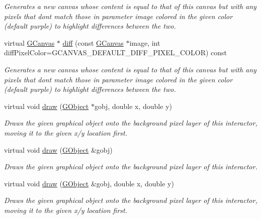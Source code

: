 \begin{DoxyCompactItemize}
\begin{DoxyCompactList}\small\item\em Generates a new canvas whose content is equal to that of this canvas but with any pixels that don\textquotesingle{}t match those in parameter \textquotesingle{}image\textquotesingle{} colored in the given color (default purple) to highlight differences between the two. \end{DoxyCompactList}\item 
virtual \mbox{\hyperlink{classsgl_1_1GCanvas}{G\+Canvas}} $\ast$ \mbox{\hyperlink{classsgl_1_1GCanvas_a5385d5c8fda55dfe0b20851d293b338b}{diff}} (const \mbox{\hyperlink{classsgl_1_1GCanvas}{G\+Canvas}} $\ast$image, int diff\+Pixel\+Color=G\+C\+A\+N\+V\+A\+S\+\_\+\+D\+E\+F\+A\+U\+L\+T\+\_\+\+D\+I\+F\+F\+\_\+\+P\+I\+X\+E\+L\+\_\+\+C\+O\+L\+OR) const
\begin{DoxyCompactList}\small\item\em Generates a new canvas whose content is equal to that of this canvas but with any pixels that don\textquotesingle{}t match those in parameter \textquotesingle{}image\textquotesingle{} colored in the given color (default purple) to highlight differences between the two. \end{DoxyCompactList}\item 
virtual void \mbox{\hyperlink{classsgl_1_1GDrawingSurface_acc3825d7a24815d1e2f78e7c3ffea6cc}{draw}} (\mbox{\hyperlink{classsgl_1_1GObject}{G\+Object}} $\ast$gobj, double x, double y)
\begin{DoxyCompactList}\small\item\em Draws the given graphical object onto the background pixel layer of this interactor, moving it to the given x/y location first. \end{DoxyCompactList}\item 
virtual void \mbox{\hyperlink{classsgl_1_1GDrawingSurface_a022a8d51c7fabcd79a0c809233e93453}{draw}} (\mbox{\hyperlink{classsgl_1_1GObject}{G\+Object}} \&gobj)
\begin{DoxyCompactList}\small\item\em Draws the given graphical object onto the background pixel layer of this interactor. \end{DoxyCompactList}\item 
virtual void \mbox{\hyperlink{classsgl_1_1GDrawingSurface_a8af8762bd6720e0a1d2a84b190e3dc96}{draw}} (\mbox{\hyperlink{classsgl_1_1GObject}{G\+Object}} \&gobj, double x, double y)
\begin{DoxyCompactList}\small\item\em Draws the given graphical object onto the background pixel layer of this interactor, moving it to the given x/y location first. \end{DoxyCompactList}\item 

\end{DoxyCompactItemize}
